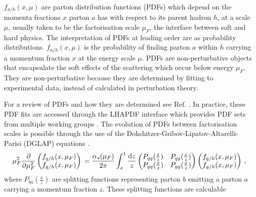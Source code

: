 \documentclass[main.tex]{subfiles}
\begin{document}
    $f_{a/h}(x, \mu)$ are parton distribution functions
    (PDFs) which depend on the momenta fractions $x$ parton $a$
    has with respect to its parent hadron $h$, at a scale $\mu$,
    usually taken to be the factorisation scale $\mu_{F}$,
    the interface between soft and hard physics.
    The interpretation of PDFs at leading order are
    as probability distributions. $f_{a/h}(x, \mu)$ is
    the probability of finding parton $a$ within $h$
    carrying a momentum fraction $x$ at the energy scale $\mu$.
    PDFs are non-perturbative objects that encapsulate
    the soft effects of the scattering which occur below energy
    $\mu_{F}$. They are non-perturbative because
    they are determined by fitting to experimental data,
    instead of calculated in perturbation theory.
    
    For a review of PDFs and how they are determined
    see Ref. \cite{Ethier:2020way,Jimenez-Delgado:2013sma}.
    In practice, these PDF fits are accessed through the
    LHAPDF interface \cite{Buckley:2014ana} which provides
    PDF sets from multiple working groups \cite{PDF4LHCWorkingGroup:2022cjn,Hou:2019efy,Bailey:2020ooq,NNPDF:2021njg}.
    The evolution of PDFs between factorisation scales is possible
    through the use of the Dokshitzer-Gribov-Lipatov-Altarelli-Parisi (DGLAP)
    equations \cite{Dokshitzer:1977sg,Gribov:1972ri,Lipatov:1974qm,Altarelli:1977zs}.
    \begin{equation}\label{eqn:DGLAP}
        \mu_{F}^{2} \dfrac{\partial}{\partial \mu_{F}^{2}}
        \begin{pmatrix}
            f_{q/h}(x,\mu_{F}) \\
            f_{g/h}(x,\mu_{F})
        \end{pmatrix} \\
        = \dfrac{\alpha_{s}(\mu_{F})}{2\pi} \int_{x}^{1} \dfrac{\mathrm{d}z}{z}
        \begin{pmatrix}
            P_{qq}(\frac{x}{z}) & P_{qg}(\frac{x}{z}) \\
            P_{gq}(\frac{x}{z}) & P_{gg}(\frac{x}{z})
        \end{pmatrix}
        \begin{pmatrix}
            f_{q/h}(x,\mu_{F}) \\
            f_{g/h}(x,\mu_{F})
        \end{pmatrix} \, ,
    \end{equation}
    where $P_{ba}(\frac{x}{z})$ are splitting functions
    representing parton $b$ emitting a parton $a$ carrying
    a momentum fraction $z$. These splitting functions are calculable
\end{document}
